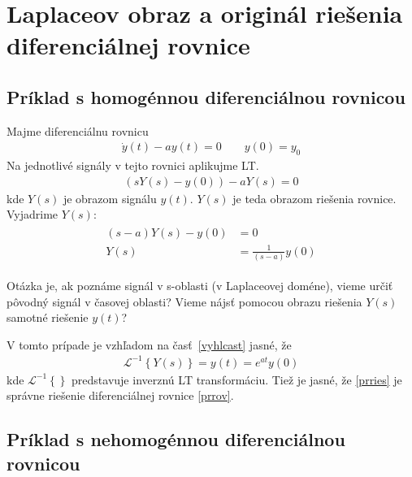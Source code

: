 \documentclass[a4paper, 10pt, ]{article}
\begin{document}
\section{Laplaceov obraz a originál riešenia diferenciálnej rovnice}

\subsection{Príklad s homogénnou diferenciálnou rovnicou}

Majme diferenciálnu rovnicu
\begin{align}  \label{prrov}
    \dot y(t) - a y(t) = 0 \qquad y(0) = y_0
\end{align}
Na jednotlivé signály v tejto rovnici aplikujme LT.
\begin{align}
    \left( s Y(s) - y(0)  \right) - a Y(s) = 0
\end{align}
kde $Y(s)$ je obrazom signálu $y(t)$. $Y(s)$ je teda obrazom riešenia rovnice. Vyjadrime $Y(s)$:
\begin{align}
    \begin{aligned}
        (s-a)Y(s) - y(0) &= 0 \\
        Y(s) &= \frac{1}{(s-a)} y(0)
    \end{aligned}
\end{align}

Otázka je, ak poznáme signál v s-oblasti (v Laplaceovej doméne), vieme určiť pôvodný signál v časovej oblasti? Vieme nájsť pomocou obrazu riešenia $Y(s)$ samotné riešenie $y(t)$?

V tomto prípade je vzhľadom na časť~\ref{vyhlcast} jasné, že
\begin{align} \label{prries}
    \mathcal L ^{-1} \left\{ Y(s) \right\} = y(t) = e^{at}y(0)
\end{align}
kde $\mathcal L ^{-1} \left\{  \right\}$ predstavuje  inverznú LT transformáciu. Tiež je jasné, že \eqref{prries} je správne riešenie diferenciálnej rovnice \eqref{prrov}.






\subsection{Príklad s nehomogénnou diferenciálnou rovnicou}
\end{document}
